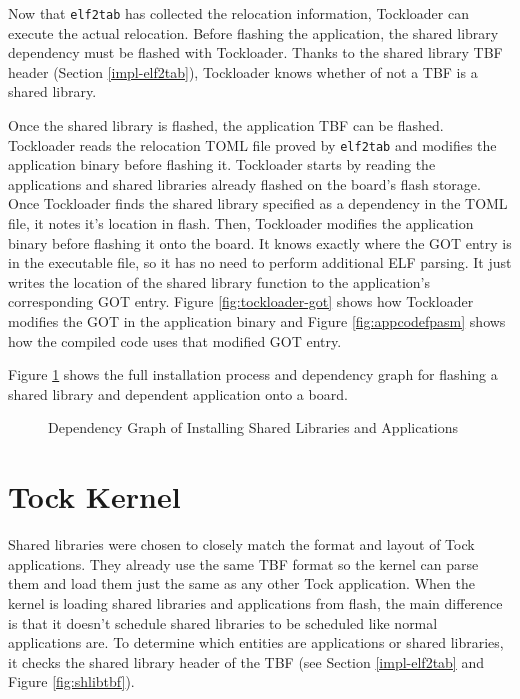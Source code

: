 \documentclass[12pt]{ucsddissertation}
\begin{document}
Now that \texttt{elf2tab} has collected the relocation information, Tockloader can execute the actual relocation. Before flashing the application, the shared library dependency must be flashed with Tockloader. Thanks to the shared library TBF header (Section \ref{impl-elf2tab}), Tockloader knows whether of not a TBF is a shared library. 

Once the shared library is flashed, the application TBF can be flashed. Tockloader reads the relocation TOML file proved by \texttt{elf2tab} and modifies the application binary before flashing it. Tockloader starts by reading the applications and shared libraries already flashed on the board's flash storage. Once Tockloader finds the shared library specified as a dependency in the TOML file, it notes it's location in flash. Then, Tockloader modifies the application binary before flashing it onto the board. It knows exactly where the GOT entry is in the executable file, so it has no need to perform additional ELF parsing. It just writes the location of the shared library function to the application's corresponding GOT entry. Figure \ref{fig:tockloader-got} shows how Tockloader modifies the GOT in the application binary and Figure \ref{fig:appcodefpasm} shows how the compiled code uses that modified GOT entry.

Figure \ref{fig:flow} shows the full installation process and dependency graph for flashing a shared library and dependent application onto a board.

\begin{figure}
    \centering
    
    \caption{Dependency Graph of Installing Shared Libraries and Applications}
    \label{fig:flow}
\end{figure}

\section{Tock Kernel}

Shared libraries were chosen to closely match the format and layout of Tock applications. They already use the same TBF format so the kernel can parse them and load them just the same as any other Tock application. When the kernel is loading shared libraries and applications from flash, the main difference is that it doesn't schedule shared libraries to be scheduled like normal applications are. To determine which entities are applications or shared libraries, it checks the shared library header of the TBF (see Section \ref{impl-elf2tab} and Figure \ref{fig:shlibtbf}). 
\end{document}
